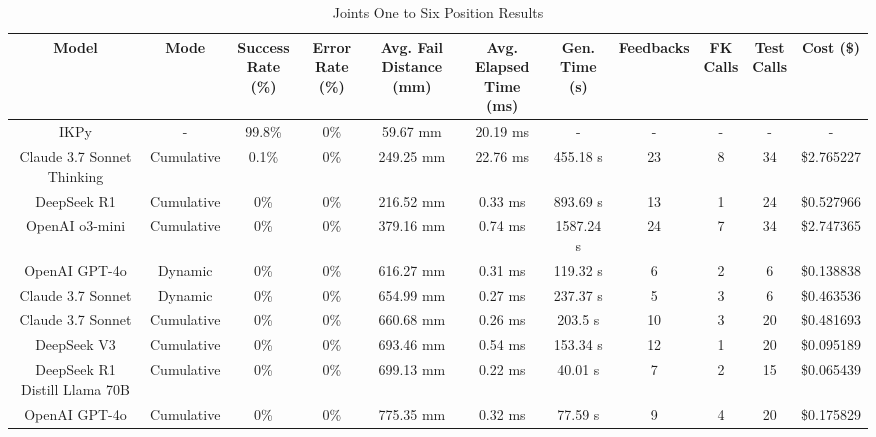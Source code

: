 \begin{landscape}
\begin{table}[H]
\tiny
\renewcommand{\arraystretch}{1.2}
\caption{Joints One to Six Position Results}
\begin{center}
\begin{tabular}{|c|c|c|c|c|c|c|c|c|c|c|}
    \hline
    \textbf{Model} & 
    \textbf{Mode} & 
    \makecell{\textbf{Success}\\\textbf{Rate (\%)}} &
    \makecell{\textbf{Error}\\\textbf{Rate (\%)}} &
    \makecell{\textbf{Avg. Fail}\\\textbf{Distance (mm)}} &
    \makecell{\textbf{Avg. Elapsed}\\\textbf{Time (ms)}} &
    \makecell{\textbf{Gen.}\\\textbf{Time (s)}} &
    \textbf{Feedbacks} &
    \makecell{\textbf{FK}\\\textbf{Calls}} &
    \makecell{\textbf{Test}\\\textbf{Calls}} &
    \textbf{Cost (\$)} \\
    \hline
    IKPy & - & 99.8\% & 0\% & 59.67 mm & 20.19 ms & - & - & - & - & - \\
    \hline
    Claude 3.7 Sonnet Thinking & Cumulative & 0.1\% & 0\% & 249.25 mm & 22.76 ms & 455.18 s & 23 & 8 & 34 & \$2.765227 \\
    \hline
    DeepSeek R1 & Cumulative & 0\% & 0\% & 216.52 mm & 0.33 ms & 893.69 s & 13 & 1 & 24 & \$0.527966 \\
    \hline
    OpenAI o3-mini & Cumulative & 0\% & 0\% & 379.16 mm & 0.74 ms & 1587.24 s & 24 & 7 & 34 & \$2.747365 \\
    \hline
    OpenAI GPT-4o & Dynamic & 0\% & 0\% & 616.27 mm & 0.31 ms & 119.32 s & 6 & 2 & 6 & \$0.138838 \\
    \hline
    Claude 3.7 Sonnet & Dynamic & 0\% & 0\% & 654.99 mm & 0.27 ms & 237.37 s & 5 & 3 & 6 & \$0.463536 \\
    \hline
    Claude 3.7 Sonnet & Cumulative & 0\% & 0\% & 660.68 mm & 0.26 ms & 203.5 s & 10 & 3 & 20 & \$0.481693 \\
    \hline
    DeepSeek V3 & Cumulative & 0\% & 0\% & 693.46 mm & 0.54 ms & 153.34 s & 12 & 1 & 20 & \$0.095189 \\
    \hline
    DeepSeek R1 Distill Llama 70B & Cumulative & 0\% & 0\% & 699.13 mm & 0.22 ms & 40.01 s & 7 & 2 & 15 & \$0.065439 \\
    \hline
    OpenAI GPT-4o & Cumulative & 0\% & 0\% & 775.35 mm & 0.32 ms & 77.59 s & 9 & 4 & 20 & \$0.175829 \\

\end{tabular}
\end{center}
\end{table}
\end{landscape}
